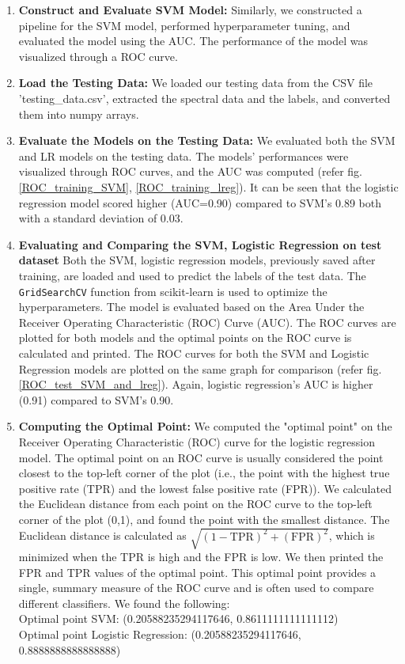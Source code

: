 \documentclass{cernatsnote}
\begin{document}
\begin{enumerate}
\item \textbf{Construct and Evaluate SVM Model:} Similarly, we constructed a pipeline for the SVM model, performed hyperparameter tuning, and evaluated the model using the AUC. The performance of the model was visualized through a ROC curve.

\item \textbf{Load the Testing Data:} We loaded our testing data from the CSV file 'testing\_data.csv', extracted the spectral data and the labels, and converted them into numpy arrays.

\item \textbf{Evaluate the Models on the Testing Data:} We evaluated both the SVM and LR models on the testing data. The models' performances were visualized through ROC curves, and the AUC was computed (refer fig.\ref{ROC_training_SVM}, \ref{ROC_training_lreg}). It can be seen that the logistic regression model scored higher (AUC=0.90) compared to SVM's 0.89 both with a standard deviation of 0.03.

\item \textbf{Evaluating and Comparing the SVM, Logistic Regression on test dataset}
Both the SVM, logistic regression models, previously saved after training, are loaded and used to predict the labels of the test data. The \texttt{GridSearchCV} function from scikit-learn is used to optimize the hyperparameters. The model is evaluated based on the Area Under the Receiver Operating Characteristic (ROC) Curve (AUC). The ROC curves are plotted for both models and the optimal points on the ROC curve is calculated and printed. The ROC curves for both the SVM and Logistic Regression models are plotted on the same graph for comparison (refer fig.\ref{ROC_test_SVM_and_lreg}). Again, logistic regression's AUC is higher (0.91) compared to SVM's 0.90.


\item \textbf{Computing the Optimal Point:} We computed the "optimal point" on the Receiver Operating Characteristic (ROC) curve for the logistic regression model. The optimal point on an ROC curve is usually considered the point closest to the top-left corner of the plot (i.e., the point with the highest true positive rate (TPR) and the lowest false positive rate (FPR)). We calculated the Euclidean distance from each point on the ROC curve to the top-left corner of the plot (0,1), and found the point with the smallest distance. The Euclidean distance is calculated as \(\sqrt{(1 - \text{{TPR}})^2 + (\text{{FPR}})^2}\), which is minimized when the TPR is high and the FPR is low. We then printed the FPR and TPR values of the optimal point. This optimal point provides a single, summary measure of the ROC curve and is often used to compare different classifiers. We found the following:\\
Optimal point SVM: (0.20588235294117646, 0.8611111111111112)\\
Optimal point Logistic Regression: (0.20588235294117646, 0.8888888888888888)

\end{enumerate}
\end{document}

